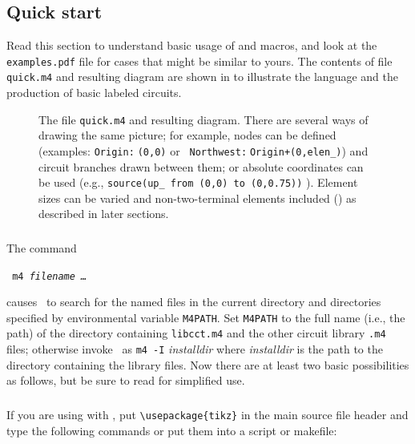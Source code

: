 \subsection{Quick start\label{Quickstart:}}
Read this section to understand basic usage of \Mfour and macros,
and look at the {\tt examples.pdf} file for cases
that might be similar to yours.
The contents of file {\tt quick.m4} and resulting diagram are shown
in  to illustrate the language and the production of basic
labeled circuits.
\begin{figure}[ht]
   \parbox{\textwidth}{\small}%
   \hfill\llap{\raise-1in\hbox{ }}%
   \caption{The file {\tt quick.m4} and resulting diagram.
     There are several ways of drawing the same picture; for example,
     nodes can be defined (examples: {\tt Origin:$\;$(0,0)} or {\tt
     Northwest:$\;$Origin+(0,elen\_)}) and circuit branches drawn between them;
     or absolute coordinates can be used (e.g., {\tt source(up\_
     from (0,0) to (0,0.75))} ).  Element sizes can be varied and
     non-two-terminal elements included () as described in
     later sections.\label{quick}}%
   \end{figure}

\subsubsection{%
\label{Usingmfour:}}
The command

  {\vspace*\parsep\tt
    m4 {\sl filename \ldots}
   \vspace*\parsep}

\noindent
causes \Mfour\ to search for the named
files in the current directory and directories specified
by environmental variable {\tt M4PATH}. 
Set {\tt M4PATH} to the full name (i.e., the path) of the directory containing
{\tt libcct.m4} and the other circuit library {\tt .m4} files; otherwise
invoke \Mfour\ as {\tt m4 -I} {\sl installdir} 
where {\sl installdir} is the path to the directory
containing the library files.
Now there are at least two basic possibilities as follows,
but be sure to read  for simplified use.

\subsubsection{%
\label{Processingwithpstricks:}}
If you are using \dpic  with \TPGF,
put \verb|\usepackage{tikz}| in the main \latex source file header and
type the following commands or put them into a script or makefile:

